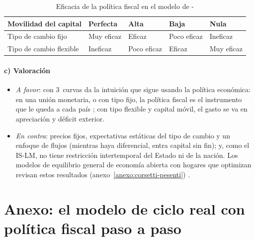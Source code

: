 \documentclass[11pt]{article}
\begin{document}
\begin{table}[H]
\centering
\caption{Eficacia de la política fiscal en el modelo de -}\label{tab:mundell-fleming}
\small
\begin{tabular}{>{\raggedright\arraybackslash}m{3.2cm}>{\centering\arraybackslash}m{2.3cm}>{\centering\arraybackslash}m{2.3cm}>{\centering\arraybackslash}m{2.3cm}>{\centering\arraybackslash}m{2.3cm}}
\toprule
\rowcolor{tceeazulpalido} Movilidad del capital & Perfecta & Alta & Baja & Nula\\
\midrule
Tipo de cambio fijo & \textcolor{tceeverde}{Muy eficaz} & \textcolor{tceeverde}{Eficaz} & \textcolor{tceedorado}{Poco eficaz} & \textcolor{tceerojo}{Ineficaz}\\
Tipo de cambio flexible & \textcolor{tceerojo}{Ineficaz} & \textcolor{tceedorado}{Poco eficaz} & \textcolor{tceeverde}{Eficaz} & \textcolor{tceeverde}{Muy eficaz}\\
\bottomrule
\end{tabular}
\end{table}

\paragraph{c) Valoración}

\begin{itemize}
\item \emph{A favor}: con 3~curvas da la intuición que sigue usando la política económica: en una unión monetaria, o con tipo fijo, la política fiscal es el instrumento que le queda a cada país ; con tipo flexible y capital móvil, el gasto se va en apreciación y déficit exterior.
\item \emph{En contra}: precios fijos, expectativas estáticas del tipo de cambio y un enfoque de flujos (mientras haya diferencial, entra capital sin fin); y, como el IS-LM, no tiene restricción intertemporal del Estado ni de la nación. Los modelos de equilibrio general de economía abierta con hogares que optimizan revisan estos resultados (anexo~\ref{anexo:corsetti-pesenti}) .
\end{itemize}

\section{Anexo: el modelo de ciclo real\cortetitulo{} con política fiscal paso a paso}\label{anexo:rbc-fiscal}
\end{document}
